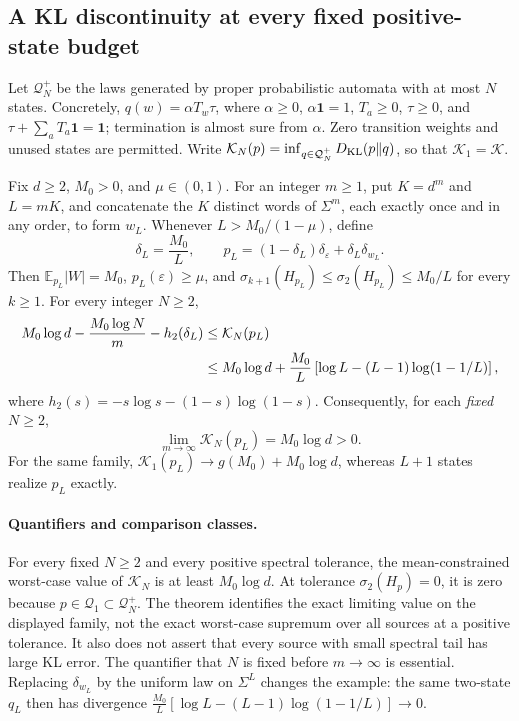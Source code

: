 \subsection{A KL discontinuity at every fixed positive-state budget}
\label{II:U:sec:kl-fixed-states}
Let $\mathcal Q_N^+$ be the laws generated by proper probabilistic
automata with at most $N$ states. Concretely,
$q(w)=\alpha T_w\tau$, where $\alpha\ge0$, $\alpha\mathbf1=1$,
$T_a\ge0$, $\tau\ge0$, and
$\tau+\sum_aT_a\mathbf1=\mathbf1$; termination is almost sure from
$\alpha$. Zero transition weights and unused states are permitted.
Write $\mathcal K_N(p)=\inf_{q\in\mathcal Q_N^+}D_{\rm KL}(p\|q)$,
so that $\mathcal K_1=\mathcal K$.

\begin{theorem}
\label{II:U:thm:kl-fixed-states}
Fix $d\ge2$, $M_0>0$, and $\mu\in(0,1)$. For an integer $m\ge1$,
put $K=d^m$ and $L=mK$, and concatenate the $K$ distinct words of
$\Sigma^m$, each exactly once and in any order, to form $w_L$.
Whenever $L>M_0/(1-\mu)$, define
\[
 \delta_L=\frac{M_0}{L},\qquad
 p_L=(1-\delta_L)\delta_\varepsilon+\delta_L\delta_{w_L}.
\]
Then $\mathbb E_{p_L}|W|=M_0$, $p_L(\varepsilon)\ge\mu$, and
$\sigma_{k+1}(H_{p_L})\le\sigma_2(H_{p_L})\le M_0/L$ for every
$k\ge1$. For every integer $N\ge2$,
\begin{align}
 M_0\log d-\frac{M_0\log N}{m}-h_2(\delta_L)
 &\le\mathcal K_N(p_L)\notag\\
 &\le M_0\log d+\frac{M_0}{L}
 \left[\log L-(L-1)\log(1-1/L)\right],
 \label{II:U:eq:kl-fixed-sandwich}
\end{align}
where $h_2(s)=-s\log s-(1-s)\log(1-s)$. Consequently, for each
\emph{fixed} $N\ge2$,
\[
 \lim_{m\to\infty}\mathcal K_N(p_L)=M_0\log d>0.
\]
For the same family, $\mathcal K_1(p_L)\to g(M_0)+M_0\log d$,
whereas $L+1$ states realize $p_L$ exactly.
\end{theorem}


\paragraph{Quantifiers and comparison classes.}
For every fixed $N\ge2$ and every positive spectral tolerance, the
mean-constrained worst-case value of $\mathcal K_N$ is at least
$M_0\log d$. At tolerance $\sigma_2(H_p)=0$, it is zero because
$p\in\mathcal Q_1\subset\mathcal Q_N^+$. The theorem identifies the
exact limiting value on the displayed family, not the exact worst-case
supremum over all sources at a positive tolerance. It also does not assert
that every source with small spectral tail has large KL error. The
quantifier that $N$ is fixed before $m\to\infty$ is essential.
Replacing $\delta_{w_L}$ by the uniform law on $\Sigma^L$ changes the
example: the same two-state $q_L$ then has divergence
$\frac{M_0}{L}[\log L-(L-1)\log(1-1/L)]\to0$.

